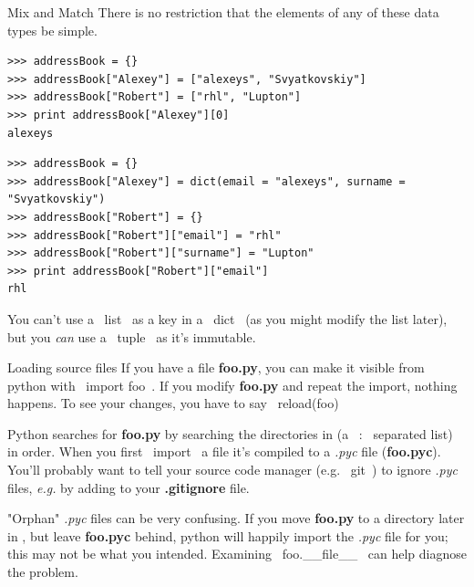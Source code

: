 \documentclass[10pt, t]{beamer}
\let\texttt=\graytt
\let\verb=\codeDelimTwiddles
\let\alert=\textbf
\begin{document}
\begin{frame}[fragile,label=sec-2-8]{Mix and Match}
 There is no restriction that the elements of any of these data types be simple.
\pause
\lstset{language=Python,label= ,caption= ,numbers=none}
\begin{lstlisting}
>>> addressBook = {}
>>> addressBook["Alexey"] = ["alexeys", "Svyatkovskiy"]
>>> addressBook["Robert"] = ["rhl", "Lupton"]
>>> print addressBook["Alexey"][0]
alexeys
\end{lstlisting}
\pause
\lstset{language=Python,label= ,caption= ,numbers=none}
\begin{lstlisting}
>>> addressBook = {}
>>> addressBook["Alexey"] = dict(email = "alexeys", surname = "Svyatkovskiy")
>>> addressBook["Robert"] = {}
>>> addressBook["Robert"]["email"] = "rhl"
>>> addressBook["Robert"]["surname"] = "Lupton"
>>> print addressBook["Robert"]["email"]
rhl
\end{lstlisting}

\pause
You can't use a \verb~list~ as a key in a \verb~dict~ (as you might modify the list later), but you \emph{can} use a \verb~tuple~
as it's immutable.
\end{frame}

\begin{frame}[fragile,label=sec-2-9]{Loading source files}
 If you have a file \alert{foo.py}, you can make it visible from python with \verb~import foo~.  If you modify
\alert{foo.py} and repeat the import, nothing happens.
\pause To see your changes, you have to say \verb~reload(foo)~

\pause
Python searches for \alert{foo.py} by searching the directories in \texttt{\$PYTHONPATH} (a \verb~:~ separated list)
in order.
\pause
When you first \verb~import~ a file it's compiled to a \emph{.pyc} file (\alert{foo.pyc}).  You'll probably want to tell
your source code manager (e.g. \verb~git~) to ignore \emph{.pyc} files, \emph{e.g.} by adding \texttt{*.pyc} to 
your \alert{.gitignore} file.

\pause
"Orphan" \textit{.pyc} files can be very confusing.
\pause
If you move \alert{foo.py} to a directory later in \texttt{\$PYTHONPATH}, but leave \alert{foo.pyc} behind, python will happily import 
the \emph{.pyc} file for you;  this may not be what you intended.
\pause
Examining \verb~foo.\_\_file\_\_~ can help diagnose the problem.
\end{frame}
\end{document}
